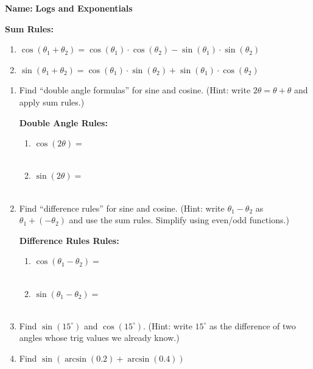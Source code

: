 \documentclass{article}
\newcommand{\greybox}[2]{\begin{tcolorbox}\textbf{#1:}\\ {#2}\end{tcolorbox}}
\begin{document}
\noindent \textbf{Name:}\underline{\hspace{2in}} \hfill \textbf{Logs and Exponentials}

\greybox{Sum Rules}{
  \vspace{-1em}
  \begin{enumerate}
    \item $\cos(\theta_1 + \theta_2) = \cos(\theta_1) \cdot \cos(\theta_2) - \sin(\theta_1) \cdot \sin(\theta_2)$
    \item $\sin(\theta_1 + \theta_2) = \cos(\theta_1) \cdot \sin(\theta_2) + \sin(\theta_1) \cdot \cos(\theta_2)$
    \end{enumerate}
  }

\begin{enumerate}
\item Find ``double angle formulas'' for sine and cosine. (Hint: write $2 \theta = \theta + \theta$ and apply sum rules.)
\greybox{Double Angle Rules}{
  \vspace{-1em}
  \begin{enumerate}
    \item $\cos(2 \theta ) = $ \\ \\
    \item $\sin(2\theta) =$ \\ \\
    \end{enumerate}
  }
  \vspace{1in}
\item Find ``difference rules'' for sine and cosine. (Hint: write $\theta_1 - \theta_2$ as $\theta_1 + (-\theta_2)$ and use the sum rules. Simplify using even/odd functions.)
  \greybox{Difference Rules Rules}{
  \vspace{-1em}
  \begin{enumerate}
    \item $\cos(\theta_1 - \theta_2) = $ \\ \\
    \item $\sin(\theta_1 - \theta_2) =$ \\ \\
    \end{enumerate}
  }
  \vspace{1in}
\item Find $\sin(15^\circ)$ and $\cos(15^\circ)$. (Hint: write $15^\circ$ as the difference of two angles whose trig values we already know.)
  \newpage
\item Find $\sin(\arcsin(0.2) + \arcsin(0.4))$

\end{enumerate}
\end{document}
